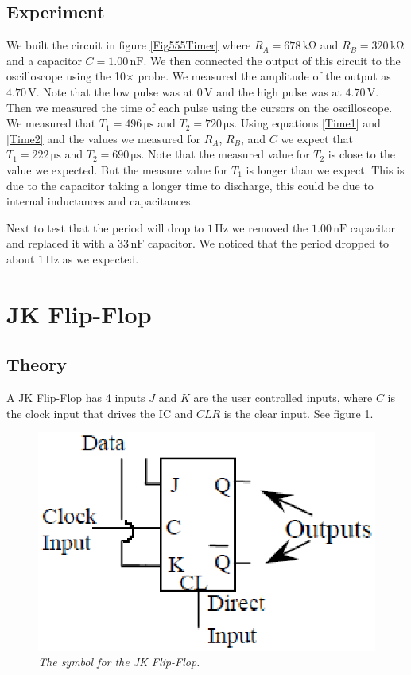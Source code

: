 \documentclass[11pt]{article}
\numberwithin{equation}{section}
\numberwithin{figure}{section}
\numberwithin{table}{section}
\newcommand{\unit}[1]{\ensuremath{\, \mathrm{#1}}}
\begin{document}
\subsection{Experiment}
We built the circuit in figure \ref{Fig555Timer} where $R_A = 678\unit{k\Omega}$ and $R_B = 320\unit{k\Omega}$ and a capacitor $C=1.00\unit{nF}$. We then connected the output of this circuit to the oscilloscope using the 10$\times$ probe. We measured the amplitude of the output as $4.70\unit{V}$. Note that the low pulse was at $0\unit{V}$ and the high pulse was at $4.70\unit{V}$. Then we measured the time of each pulse using the cursors on the oscilloscope. We measured that $T_1 = 496\unit{\mu s}$ and $T_2 = 720\unit{\mu s}$. Using equations \ref{Time1} and \ref{Time2} and the values we measured for $R_A$, $R_B$, and $C$ we expect that $T_1 = 222\unit{\mu s}$ and $T_2 = 690\unit{\mu s}$. Note that the measured value for $T_2$ is close to the value we expected. But the measure value for $T_1$ is longer than we expect. This is due to the capacitor taking a longer time to discharge, this could be due to internal inductances and capacitances.

Next to test that the period will drop to $1\unit{Hz}$ we removed the $1.00\unit{nF}$ capacitor and replaced it with a $33\unit{nF}$ capacitor. We noticed that the period dropped to about $1\unit{Hz}$ as we expected.

\section{JK Flip-Flop}
\subsection{Theory}
A JK Flip-Flop has 4 inputs $J$ and $K$ are the user controlled inputs, where $C$ is the clock input that drives the IC and $CLR$ is the clear input. See figure \ref{FigJKFlipFlop}.
\begin{figure}[h]
\centering
\includegraphics[scale=0.60]{FigJKFlipFlop.eps}
\caption{\textit{The symbol for the JK Flip-Flop.}}
\label{FigJKFlipFlop}
\end{figure}
\end{document}
